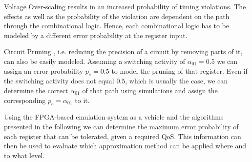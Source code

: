 \documentclass[conference]{IEEEtran}
\begin{document}
\begin{LaTeXdescription}
\item[Voltage Over-scaling] results in an increased probability of timing violations. The effects as well as the probability of the violation are dependent on the path through the combinational logic. Hence, each combinational logic has to be modeled by a different error probability at the register input.
\item[Circuit Pruning], i.e. reducing the precision of a circuit by removing parts of it, can also be easily modeled. Assuming a switching activity of $\alpha_{01}=0.5$ we can assign an error probability $p_e=0.5$ to model the pruning of that register. Even if the switching activity does not equal $0.5$, which is usually the case, we can determine the correct $\alpha_{01}$ of that path using simulations and assign the corresponding $p_e=\alpha_{01}$ to it.
\end{LaTeXdescription}
Using the FPGA-based emulation system as a vehicle and the algorithms presented in the following we can determine the maximum error probability of each register that can be tolerated, given a required QoS. This information can then be used to evaluate which approximation method can be applied where and to what level.
\end{document}
